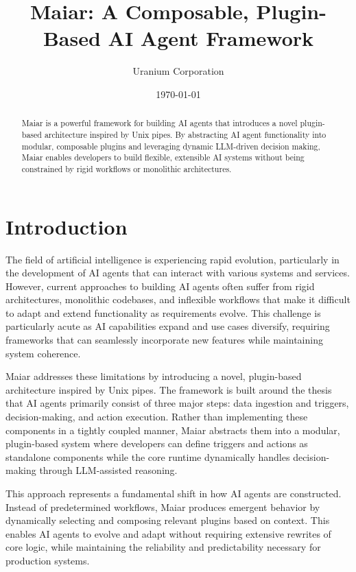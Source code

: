 \documentclass[12pt]{article}
\title{Maiar: A Composable, Plugin-Based AI Agent Framework}
\author{Uranium Corporation}
\date{\today}
\begin{document}
\maketitle

\begin{abstract}
Maiar is a powerful framework for building AI agents that introduces a novel plugin-based architecture inspired by Unix pipes. By abstracting AI agent functionality into modular, composable plugins and leveraging dynamic LLM-driven decision making, Maiar enables developers to build flexible, extensible AI systems without being constrained by rigid workflows or monolithic architectures.
\end{abstract}

\section{Introduction}
The field of artificial intelligence is experiencing rapid evolution, particularly in the development of AI agents that can interact with various systems and services. However, current approaches to building AI agents often suffer from rigid architectures, monolithic codebases, and inflexible workflows that make it difficult to adapt and extend functionality as requirements evolve. This challenge is particularly acute as AI capabilities expand and use cases diversify, requiring frameworks that can seamlessly incorporate new features while maintaining system coherence.

Maiar addresses these limitations by introducing a novel, plugin-based architecture inspired by Unix pipes. The framework is built around the thesis that AI agents primarily consist of three major steps: data ingestion and triggers, decision-making, and action execution. Rather than implementing these components in a tightly coupled manner, Maiar abstracts them into a modular, plugin-based system where developers can define triggers and actions as standalone components while the core runtime dynamically handles decision-making through LLM-assisted reasoning.

This approach represents a fundamental shift in how AI agents are constructed. Instead of predetermined workflows, Maiar produces emergent behavior by dynamically selecting and composing relevant plugins based on context. This enables AI agents to evolve and adapt without requiring extensive rewrites of core logic, while maintaining the reliability and predictability necessary for production systems.
\end{document}
